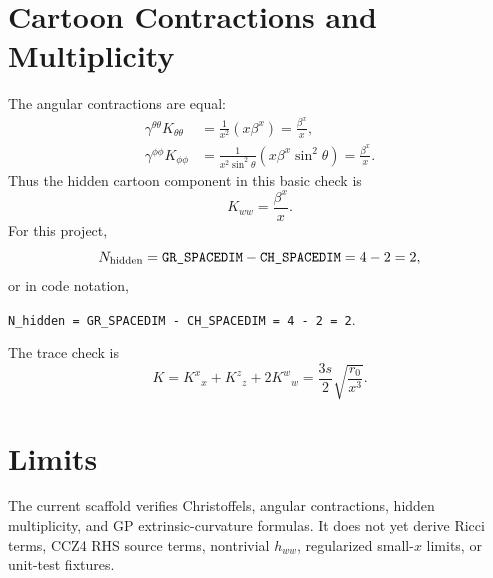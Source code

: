 \documentclass[11pt]{article}
\newcommand{\GRSP}{\texttt{GR\_SPACEDIM}}
\newcommand{\CHSP}{\texttt{CH\_SPACEDIM}}
\begin{document}
\section{Cartoon Contractions and Multiplicity}

The angular contractions are equal:
\begin{align}
  \gamma^{\theta\theta}K_{\theta\theta}
  &=
  \frac{1}{x^2}(x\beta^x)
  =
  \frac{\beta^x}{x},\\
  \gamma^{\phi\phi}K_{\phi\phi}
  &=
  \frac{1}{x^2\sin^2\theta}
  (x\beta^x\sin^2\theta)
  =
  \frac{\beta^x}{x}.
\end{align}
Thus the hidden cartoon component in this basic check is
\begin{equation}
  K_{ww}=\frac{\beta^x}{x}.
\end{equation}
For this project,
\begin{equation}
  N_{\rm hidden}=\GRSP-\CHSP=4-2=2,
\end{equation}
or in code notation,
\begin{center}
\verb|N_hidden = GR_SPACEDIM - CH_SPACEDIM = 4 - 2 = 2|.
\end{center}
The trace check is
\begin{equation}
  K = K^x{}_x + K^z{}_z + 2K^w{}_w
    = \frac{3s}{2}\sqrt{\frac{r_0}{x^3}} .
\end{equation}

\section{Limits}

The current scaffold verifies Christoffels, angular contractions, hidden
multiplicity, and GP extrinsic-curvature formulas. It does not yet derive
Ricci terms, CCZ4 RHS source terms, nontrivial \(h_{ww}\), regularized
small-\(x\) limits, or unit-test fixtures.
\end{document}
